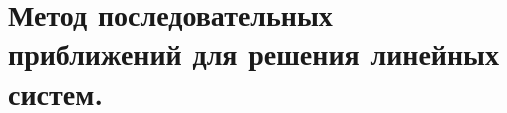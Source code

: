 \documentclass[../../calc-math-exam-2023.tex]{subfiles}
\begin{document}
    \section{Метод последовательных приближений для решения линейных систем.}\label{sec:ch21}
\end{document}
